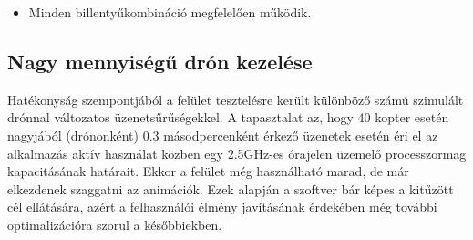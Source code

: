 \begin{itemize}

  \item Minden billentyűkombináció megfelelően működik.

\end{itemize}


\subsection{Nagy mennyiségű drón kezelése}

Hatékonyság szempontjából a felület tesztelésre került különböző számú szimulált
drónnal változatos üzenetsűrűségekkel. A tapasztalat az, hogy 40 kopter esetén
nagyjából (drónonként) 0.3 másodpercenként érkező üzenetek esetén éri el az
alkalmazás aktív használat közben egy 2.5GHz-es órajelen üzemelő processzormag
kapacitásának határait. Ekkor a felület még használható marad, de már elkezdenek
szaggatni az animációk. Ezek alapján a szoftver bár képes a kitűzött cél
ellátására, azért a felhasználói élmény javításának érdekében még további
optimalizációra szorul a későbbiekben.
